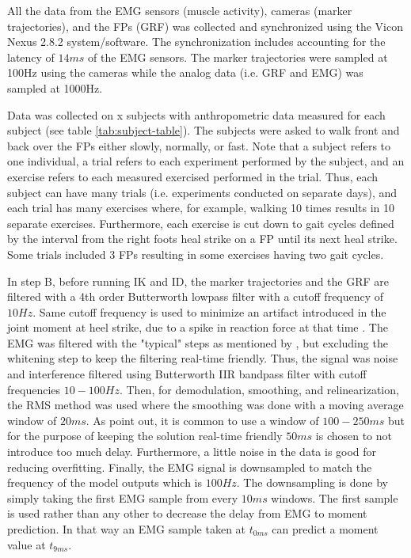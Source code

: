 \documentclass[../main.tex]{subfiles}
\begin{document}
All the data from the \ac{EMG} sensors (muscle activity), cameras (marker trajectories), and the \acp{FP} (\ac{GRF}) was collected and synchronized using the Vicon Nexus 2.8.2 system/software.
The synchronization includes accounting for the latency of $14ms$ of the \ac{EMG} sensors.
The marker trajectories were sampled at 100Hz using the cameras while the analog data (i.e. \ac{GRF} and \ac{EMG}) was sampled at 1000Hz.

Data was collected on x subjects with anthropometric data measured for each subject (see table \ref{tab:subject-table}).
The subjects were asked to walk front and back over the \acp{FP} either slowly, normally, or fast.
Note that a subject refers to one individual, a trial refers to each experiment performed by the subject, and an exercise refers to each measured exercised performed in the trial. 
Thus, each subject can have many trials (i.e. experiments conducted on separate days), and each trial has many exercises where, for example, walking 10 times results in 10 separate exercises.
Furthermore, each exercise is cut down to gait cycles defined by the interval from the right foots heal strike on a \ac{FP} until its next heal strike.
Some trials included 3 \acp{FP} resulting in some exercises having two gait cycles.


In step B, before running \ac{IK} and \ac{ID}, the marker trajectories and the \ac{GRF} are filtered with a 4th order Butterworth lowpass filter with a cutoff frequency of $10Hz$. 
Same cutoff frequency is used to minimize an artifact introduced in the joint moment at heel strike, due to a spike in reaction force at that time \cite{Kristianslund2012}.
The \ac{EMG} was filtered with the "typical" steps as mentioned by \citeauthor{Clancy2016} \parencite[99]{Clancy2016}, but excluding the whitening step to keep the filtering real-time friendly.
Thus, the signal was noise and interference filtered using Butterworth IIR bandpass filter with cutoff frequencies $10-100Hz$. 
Then, for demodulation, smoothing, and relinearization, the RMS method was used where the smoothing was done with a moving average window of $20ms$. 
As \citeauthor{Clancy2016} point out, it is common to use a window of $100-250 ms$ but for the purpose of keeping the solution real-time friendly $50ms$ is chosen to not introduce too much delay. Furthermore, a little noise in the data is good for reducing overfitting.
Finally, the \ac{EMG} signal is downsampled to match the frequency of the model outputs which is $100Hz$. The downsampling is done by simply taking the first \ac{EMG} sample from every $10ms$ windows. 
The first sample is used rather than any other to decrease the delay from \ac{EMG} to moment prediction. In that way an \ac{EMG} sample taken at $t_{0ms}$ can predict a moment value at $t_{9ms}$. 
\end{document}
